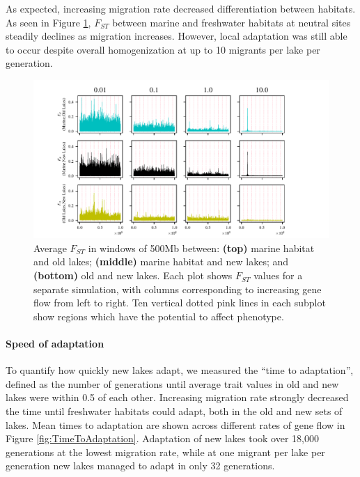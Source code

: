 \documentclass{article}
\begin{document}
As expected, increasing migration rate decreased differentiation between habitats. 
As seen in Figure \ref{fig:Fst}, 
$F_{ST}$ between marine and freshwater habitats 
at neutral sites steadily declines as migration increases. 
However, local adaptation was still able to occur despite overall homogenization 
at up to 10 migrants per lake per generation.

\begin{figure}
	\begin{center}
  		\includegraphics{Final_Plots/Fst_Genome.pdf}
  		\caption{
		Average $F_{ST}$ in windows of 500Mb between:
        \textbf{(top)} marine habitat and old lakes;
        \textbf{(middle)} marine habitat and new lakes; and
        \textbf{(bottom)} old and new lakes.
        Each plot shows $F_{ST}$ values for a separate simulation,
        with columns corresponding to increasing gene flow from left to right.
		Ten vertical dotted pink lines in each subplot 
        show regions which have the potential to affect phenotype.
     } \label{fig:Fst}
	\end{center}
\end{figure}

\paragraph*{Speed of adaptation}
To quantify how quickly new lakes adapt,
we measured the ``time to adaptation'',
defined as the number of generations until 
average trait values in old and new lakes were within 0.5 of each other.
Increasing migration rate strongly decreased the time until freshwater habitats could adapt,
both in the old and new sets of lakes.
Mean times to adaptation are shown across different rates of gene flow 
in Figure \ref{fig:TimeToAdaptation}.
Adaptation of new lakes took over 18,000 generations at the lowest migration rate,
while at one migrant per lake per generation
new lakes managed to adapt in only 32 generations. 
\end{document}
